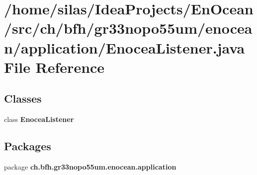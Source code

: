 \section{/home/silas/\+Idea\+Projects/\+En\+Ocean/src/ch/bfh/gr33nopo55um/enocean/application/\+Enocea\+Listener.java File Reference}
\label{EnoceaListener_8java}
\subsection*{Classes}
\begin{DoxyCompactItemize}
\item 
class {\bf Enocea\+Listener}
\end{DoxyCompactItemize}
\subsection*{Packages}
\begin{DoxyCompactItemize}
\item 
package {\bf ch.\+bfh.\+gr33nopo55um.\+enocean.\+application}
\end{DoxyCompactItemize}
